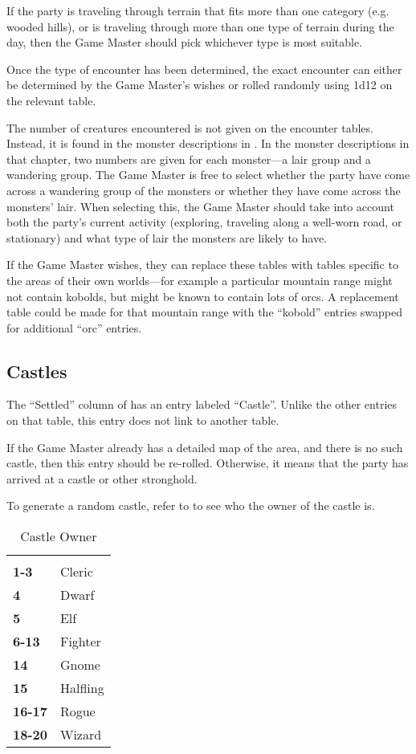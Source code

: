 \begin{multicols*}{2}
If the party is traveling through terrain that fits more than one category (e.g. wooded hills), or is traveling through more than one type of terrain during the day, then the Game Master should pick whichever type is most suitable.

Once the type of encounter has been determined, the exact encounter can either be determined by the Game Master’s wishes or rolled randomly using 1d12 on the relevant table.

The number of creatures encountered is not given on the encounter tables. Instead, it is found in the monster descriptions in . In the monster descriptions in that chapter, two numbers are given for each monster—a lair group and a wandering group. The Game Master is free to select whether the party have come across a wandering group of the monsters or whether they have come across the monsters’ lair. When selecting this, the Game Master should take into account both the party’s current activity (exploring, traveling along a well-worn road, or stationary) and what type of lair the monsters are likely to have.

If the Game Master wishes, they can replace these tables with tables specific to the areas of their own worlds—for example a particular mountain range might not contain kobolds, but might be known to contain lots of orcs. A replacement table could be made for that mountain range with the “kobold” entries swapped for additional “orc” entries.

\subsection{Castles}
The “Settled” column of  has an entry labeled “Castle”. Unlike the other entries on that table, this entry does not link to another table.

If the Game Master already has a detailed map of the area, and there is no such castle, then this entry should be re-rolled. Otherwise, it means that the party has arrived at a castle or other stronghold.

To generate a random castle, refer to  to see who the owner of the castle is.

\begin {table}[H]
  \caption{Castle Owner}\label{tab:Castle Owner}
  \begin{tabularx}{\columnwidth}{>{\bfseries}YY}
	 & \\
	1-3 & Cleric\\
	4 & Dwarf\\
	5 & Elf\\
	6-13 & Fighter\\
	14 & Gnome\\
	15 & Halfling\\
	16-17 & Rogue\\
	18-20 & Wizard
  \end {tabularx}
\end {table}


\end{multicols*}
